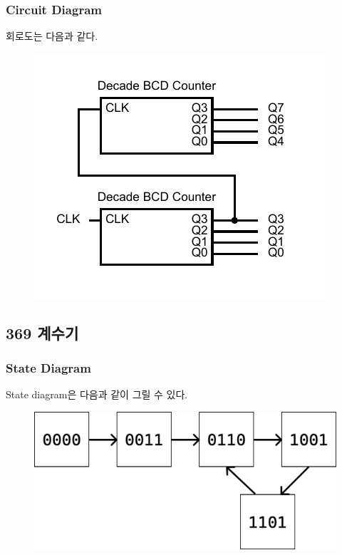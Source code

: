 \documentclass{scrartcl}
\begin{document}
\subsubsection{Circuit Diagram}
회로도는 다음과 같다.
\begin{figure}[H]
  \centering
  \includegraphics[width=0.4\linewidth]{lab6_2_circuit.pdf}
\end{figure}

\subsection{369 계수기}
\subsubsection{State Diagram}
State diagram은 다음과 같이 그릴 수 있다.
\begin{figure}[H]
  \centering
  \includegraphics[width=0.5\linewidth]{lab6_3_states.pdf}
\end{figure}
\end{document}
